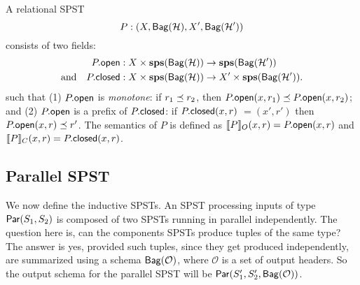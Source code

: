 \begin{definition}
A relational SPST
\[P : (X, \relleaf{\mathcal{H}}, X', \relleaf{\mathcal{H}'})\]
consists of two fields:
\begin{align*}
\spstfield{P}{open} &: X \times \sps(\relleaf{\mathcal{H}}) \to \sps(\relleaf{\mathcal{H}'}) \\
\text{and} \quad
\spstfield{P}{closed} &: X \times \sps(\relleaf{\mathcal{H}}) \to X' \times \sps(\relleaf{\mathcal{H}'}).
\end{align*}
such that
(1) $\spstfield{P}{open}$ is \emph{monotone}:
if $r_1 \prefix r_2$, then $\spstfield{P}{open}(x, r_1) \prefix \spstfield{P}{open}(x, r_2)$;
and
(2) $\spstfield{P}{open}$ is a prefix of $\spstfield{P}{closed}$:
if $\spstfield{P}{closed}(x, r)$ $= (x', r')$
then $\spstfield{P}{open}(x, r) \prefix r'$.
The semantics of $P$ is defined as
$\spstsemO{x}{r}{P} = \spstfield{P}{open}(x, r)$
and $\spstsemC{x}{r}{P} = \spstfield{P}{closed}(x, r)$.

\end{definition}

\subsection{Parallel SPST}

We now define the inductive SPSTs.
An SPST processing inputs of type
$\parcomp{S_1}{S_2}$ is composed of two SPSTs running in parallel independently.
The question here is, can the components SPSTs produce tuples of the same type?
The answer is yes, provided such tuples, since they get produced independently,
are summarized using a schema $\relleaf{\mathcal{O}}$,
where $\mathcal{O}$ is a set of output headers.
So the output schema for the parallel SPST
will be $\parthree{S_1'}{S_2'}{\relleaf{\mathcal{O}}}$.

